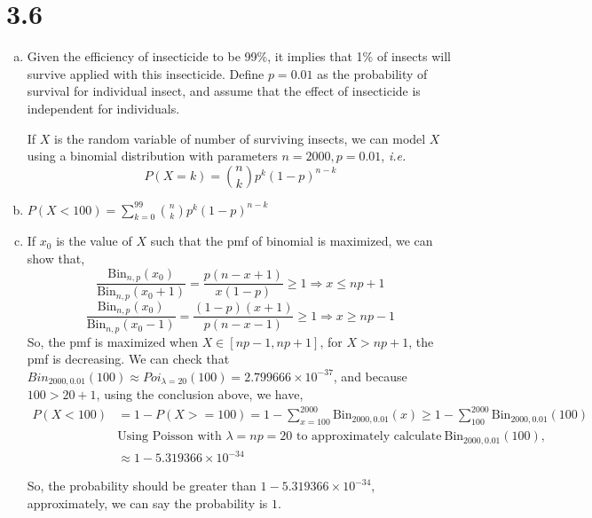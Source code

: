 \documentclass[letter]{article}
\begin{document}
    \section*{3.6}
    \begin{enumerate}[(a)]
    \item Given the efficiency of insecticide to be 99\%, it implies that 1\% of insects will survive applied with this insecticide. Define $p = 0.01$ as the probability of survival for individual insect, and assume that the effect of insecticide is independent for individuals. 
    
    If $X$ is the random variable of number of surviving insects, we can model $X$ using a binomial distribution with parameters $n = 2000, p =0.01$, \emph{i.e.}
    \[
    P(X=k) = \binom{n}{k} p^k(1-p)^{n-k}
    \]
    \item $P(X < 100) = \sum_{k=0}^{99} \binom{n}{k} p^k(1-p)^{n-k}$
    \item If $x_0$ is the value of $X$ such that the pmf of binomial is maximized, we can show that,
    \[
    \frac{\text{Bin}_{n,p}(x_0)}{\text{Bin}_{n,p}(x_0+1)} = \frac{p(n-x+1)}{x(1-p)} \ge 1 \Rightarrow x \le np+1 
    \]
    \[
    \frac{\text{Bin}_{n,p}(x_0)}{\text{Bin}_{n,p}(x_0-1)} = \frac{(1-p)(x+1)}{p(n-x-1)} \ge 1 \Rightarrow x \ge np-1 
    \]
    So, the pmf is maximized when $X \in [np-1, np+1]$, for $X > np+1$, the pmf is decreasing.
    We can check that $Bin_{2000, 0.01}(100) \approx Poi_{\lambda=20}(100) = 2.799666 \times 10^{-37} $, and because $100 > 20 + 1$, using the conclusion above, we have,
    \begin{align*}
    P(X < 100) & = 1 - P(X >= 100) = 1 - \sum_{x=100}^{2000} \text{Bin}_{2000,0.01}(x) \ge 1 - \sum_{100}^{2000} \text{Bin}_{2000,0.01}(100) \\
    & \text{Using Poisson with $\lambda=np=20$ to approximately calculate}~\text{Bin}_{2000,0.01}(100),\\
    & \approx 1 - 5.319366 \times 10^{-34}
    \end{align*}

    So, the probability should be greater than $1 - 5.319366 \times 10^{-34}$, approximately, we can say the probability is $1$.
    \end{enumerate}
\end{document}
